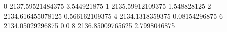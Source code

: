 0 2137.59521484375 3.544921875
1 2135.59912109375 1.548828125
2 2134.616455078125 0.566162109375
4 2134.1318359375 0.08154296875
6 2134.05029296875 0.0
8 2136.85009765625 2.7998046875

